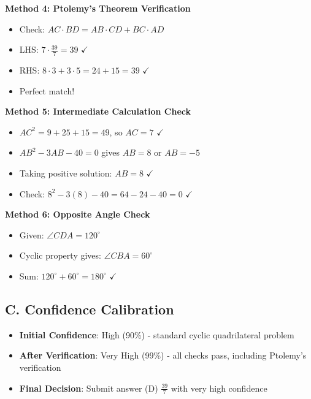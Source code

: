 \documentclass[11pt]{article}
\begin{document}
\begin{verificationbox}
\textbf{Method 4: Ptolemy's Theorem Verification}
\begin{itemize}
    \item Check: $AC \cdot BD = AB \cdot CD + BC \cdot AD$
    \item LHS: $7 \cdot \frac{39}{7} = 39$ $\checkmark$
    \item RHS: $8 \cdot 3 + 3 \cdot 5 = 24 + 15 = 39$ $\checkmark$
    \item Perfect match!
\end{itemize}

\textbf{Method 5: Intermediate Calculation Check}
\begin{itemize}
    \item $AC^2 = 9 + 25 + 15 = 49$, so $AC = 7$ $\checkmark$
    \item $AB^2 - 3AB - 40 = 0$ gives $AB = 8$ or $AB = -5$
    \item Taking positive solution: $AB = 8$ $\checkmark$
    \item Check: $8^2 - 3(8) - 40 = 64 - 24 - 40 = 0$ $\checkmark$
\end{itemize}

\textbf{Method 6: Opposite Angle Check}
\begin{itemize}
    \item Given: $\angle CDA = 120^\circ$
    \item Cyclic property gives: $\angle CBA = 60^\circ$
    \item Sum: $120^\circ + 60^\circ = 180^\circ$ $\checkmark$
\end{itemize}

\subsection*{C. Confidence Calibration}
\begin{itemize}[leftmargin=*]
    \item \textbf{Initial Confidence}: High (90\%) - standard cyclic quadrilateral problem
    \item \textbf{After Verification}: Very High (99\%) - all checks pass, including Ptolemy's verification
    \item \textbf{Final Decision}: Submit answer (D) $\frac{39}{7}$ with very high confidence
\end{itemize}
\end{verificationbox}
\end{document}

